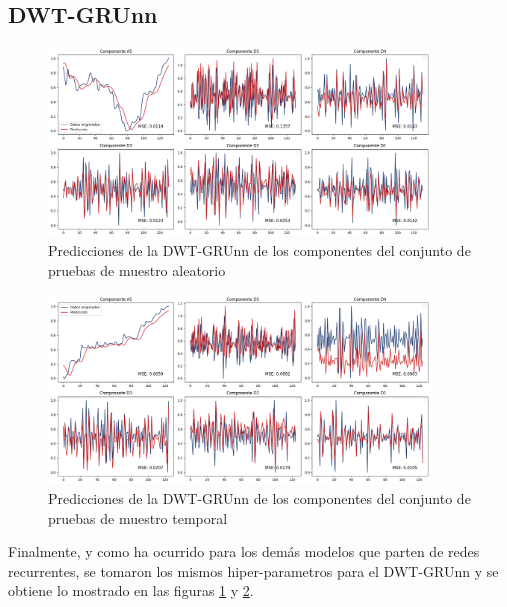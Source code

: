 \newpage
\subsection{DWT-GRUnn}

\begin{figure}[H]
    \centering
    \includegraphics[width=0.9\textwidth]{Figuras/proceso_de_entrenamiento/grafs_c_prueba/muestreo_aleatorio/DWT_GRU/estandar/DWT_GRU.png}
    \caption{Predicciones de la DWT-GRUnn de los componentes del conjunto de pruebas de muestro aleatorio} 
    \label{fig:c_prueba_componentes_DWT_GRU_aleatorio}
\end{figure}

\begin{figure}[H]
    \centering
    \includegraphics[width=0.9\textwidth]{Figuras/proceso_de_entrenamiento/grafs_c_prueba/DWT_GRU/estandar/DWT_GRU.png}
    \caption{Predicciones de la DWT-GRUnn de los componentes del conjunto de pruebas de muestro temporal} 
    \label{fig:c_prueba_componentes_DWT_GRU}
\end{figure}

Finalmente, y como ha ocurrido para los demás modelos que parten de redes recurrentes, se tomaron los mismos hiper-parametros para el DWT-GRUnn y se obtiene lo mostrado en las figuras \ref{fig:c_prueba_componentes_DWT_GRU_aleatorio} y \ref{fig:c_prueba_componentes_DWT_GRU}.

